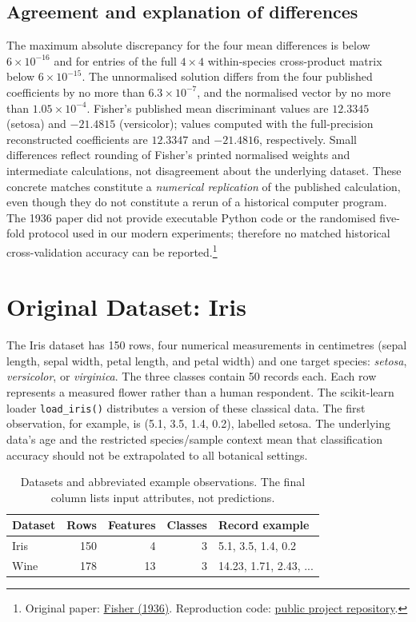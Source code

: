 \documentclass[11pt]{article}
\begin{document}
\subsection{Agreement and explanation of differences}
The maximum absolute discrepancy for the four mean differences is below $6\times10^{-16}$ and for entries of the full $4\times4$ within-species cross-product matrix below $6\times10^{-15}$. The unnormalised solution differs from the four published coefficients by no more than $6.3\times10^{-7}$, and the normalised vector by no more than $1.05\times10^{-4}$. Fisher's published mean discriminant values are $12.3345$ (setosa) and $-21.4815$ (versicolor); values computed with the full-precision reconstructed coefficients are $12.3347$ and $-21.4816$, respectively. Small differences reflect rounding of Fisher's printed normalised weights and intermediate calculations, not disagreement about the underlying dataset. These concrete matches constitute a \emph{numerical replication} of the published calculation, even though they do not constitute a rerun of a historical computer program. The 1936 paper did not provide executable Python code or the randomised five-fold protocol used in our modern experiments; therefore no matched historical cross-validation accuracy can be reported.\footnote{Original paper: \href{https://doi.org/10.1111/j.1469-1809.1936.tb02137.x}{Fisher (1936)}. Reproduction code: \href{https://github.com/gcstafftools-tech/COMP8240-Final-Project}{public project repository}.}

\section{Original Dataset: Iris}
The Iris dataset has 150 rows, four numerical measurements in centimetres (sepal length, sepal width, petal length, and petal width) and one target species: \textit{setosa}, \textit{versicolor}, or \textit{virginica}. The three classes contain 50 records each. Each row represents a measured flower rather than a human respondent. The scikit-learn loader \texttt{load\_iris()} distributes a version of these classical data. The first observation, for example, is (5.1, 3.5, 1.4, 0.2), labelled setosa. The underlying data's age and the restricted species/sample context mean that classification accuracy should not be extrapolated to all botanical settings.

\begin{table}[t]
\centering\small
\begin{tabular}{lrrrl}
\toprule
Dataset & Rows & Features & Classes & Record example \\
\midrule
Iris & 150 & 4 & 3 & 5.1, 3.5, 1.4, 0.2 \\
Wine & 178 & 13 & 3 & 14.23, 1.71, 2.43, ... \\
\bottomrule
\end{tabular}
\caption{Datasets and abbreviated example observations. The final column lists input attributes, not predictions.}
\label{tab:datasets}
\end{table}
\end{document}
